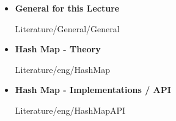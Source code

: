 \begin{frame}{\LectureFurtherLiterature}
  \begin{itemize}
    \item
      \textbf{General for this Lecture}
      \begin{btSect}{Literature/General/General}
        \btPrintAll
      \end{btSect}
  \end{itemize}
\end{frame}


\begin{frame}{\LectureFurtherLiterature}
  \begin{itemize}
    \item
      \textbf{Hash Map - Theory}
      \begin{btSect}{Literature/eng/HashMap}
        \btPrintAll
      \end{btSect}
    \item
      \textbf{Hash Map - Implementations / API}
      \begin{btSect}{Literature/eng/HashMapAPI}
        \btPrintAll
      \end{btSect}
  \end{itemize}
\end{frame}